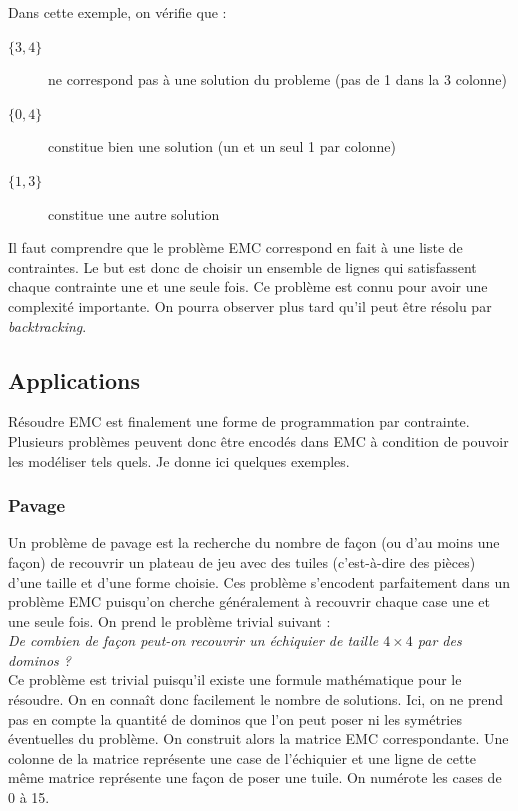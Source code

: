 \documentclass[a4paper]{article}
\begin{document}
Dans cette exemple, on vérifie que :

\begin{description}
\item[$ \{3, 4\} $] ne correspond pas à une solution du probleme (pas de 1 dans la 3 colonne)
\item[$ \{0, 4\} $] constitue bien une solution (un et un seul 1 par colonne)
\item[$ \{1, 3\} $] constitue une autre solution
\end{description}

Il faut comprendre que le problème EMC correspond en fait à une liste de 
contraintes. Le but est donc de choisir un ensemble de lignes qui satisfassent 
chaque contrainte une et une seule fois.
Ce problème est connu pour avoir une complexité importante. On pourra observer 
plus tard qu'il peut être résolu par \emph{backtracking}.


\subsection{Applications}

Résoudre EMC est finalement une forme de programmation par contrainte. 
Plusieurs problèmes peuvent donc être encodés dans EMC à 
condition de pouvoir les modéliser tels quels. Je donne ici quelques 
exemples.


\subsubsection{Pavage}
Un problème de pavage est la recherche du nombre de façon 
(ou d'au moins une façon) de recouvrir un
plateau de jeu avec des tuiles (c'est-à-dire des pièces) d'une taille et d'une
forme choisie. Ces problème s'encodent parfaitement dans un problème EMC
puisqu'on cherche généralement à recouvrir chaque case une et une 
seule fois. 
On prend le problème trivial suivant : \\


\emph{De combien de façon peut-on recouvrir un échiquier de taille 
$4\times4$ par des dominos ?}
\\

Ce problème est trivial puisqu'il existe une formule mathématique pour le 
résoudre. On en connaît donc facilement le nombre de solutions. 
Ici, on ne prend 
pas en compte la quantité de dominos que l'on peut poser ni les symétries 
éventuelles du problème. On construit alors la
matrice EMC correspondante. Une colonne de la matrice représente une case de 
l'échiquier et une ligne de cette même matrice représente une façon de poser 
une tuile. On numérote les cases de 0 à 15.
\end{document}
